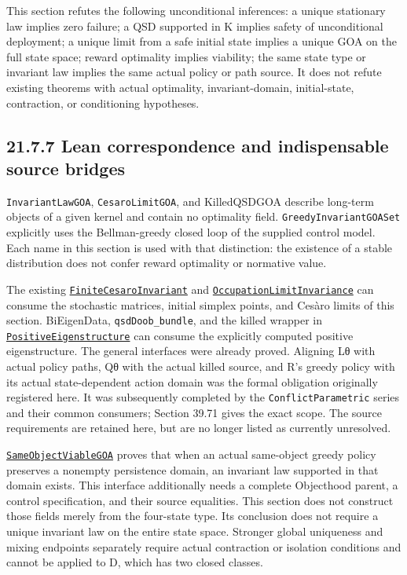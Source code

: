\documentclass[
  english,
  11pt,
  oneside]{book}
\newcounter{none} %
\begin{document}
This section refutes the following unconditional inferences: a unique stationary law implies zero failure; a QSD supported in K implies safety of unconditional deployment; a unique limit from a safe initial state implies a unique GOA on the full state space; reward optimality implies viability; the same state type or invariant law implies the same actual policy or path source. It does not refute existing theorems with actual optimality, invariant-domain, initial-state, contraction, or conditioning hypotheses.

\subsection{21.7.7 Lean correspondence and indispensable source bridges}\label{lean-correspondence-and-indispensable-source-bridges}

\nolinkurl{InvariantLawGOA}, \nolinkurl{CesaroLimitGOA}, and KilledQSDGOA describe long-term objects of a given kernel and contain no optimality field. \nolinkurl{GreedyInvariantGOASet} explicitly uses the Bellman-greedy closed loop of the supplied control model. Each name in this section is used with that distinction: the existence of a stable distribution does not confer reward optimality or normative value.

The existing \href{../formalization/ueot-core/UEOT/V3/FiniteCesaroInvariant.lean}{\nolinkurl{FiniteCesaroInvariant}} and \href{../formalization/ueot-core/UEOT/V3/Compression/OccupationLimitInvariance.lean}{\nolinkurl{OccupationLimitInvariance}} can consume the stochastic matrices, initial simplex points, and Cesàro limits of this section. BiEigenData, \nolinkurl{qsdDoob_bundle}, and the killed wrapper in \href{../formalization/ueot-core/UEOT/V3/Compression/PositiveEigenstructure.lean}{\nolinkurl{PositiveEigenstructure}} can consume the explicitly computed positive eigenstructure. The general interfaces were already proved. Aligning Lθ with actual policy paths, Qθ with the actual killed source, and R's greedy policy with its actual state-dependent action domain was the formal obligation originally registered here. It was subsequently completed by the \nolinkurl{ConflictParametric} series and their common consumers; Section 39.71 gives the exact scope. The source requirements are retained here, but are no longer listed as currently unresolved.

\href{../formalization/ueot-core/UEOT/V3/Compression/TheoryCompletion/SameObjectViableGOA.lean}{\nolinkurl{SameObjectViableGOA}} proves that when an actual same-object greedy policy preserves a nonempty persistence domain, an invariant law supported in that domain exists. This interface additionally needs a complete Objecthood parent, a control specification, and their source equalities. This section does not construct those fields merely from the four-state type. Its conclusion does not require a unique invariant law on the entire state space. Stronger global uniqueness and mixing endpoints separately require actual contraction or isolation conditions and cannot be applied to D, which has two closed classes.
\end{document}

